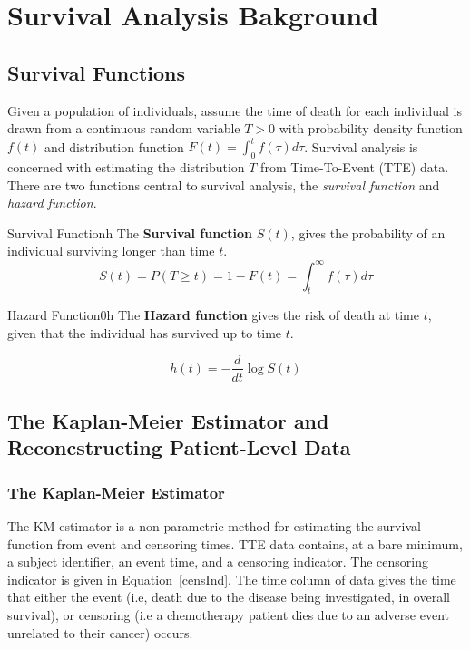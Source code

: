 \chapter{Survival Analysis Bakground}\label{survchap}

\section{Survival Functions}
Given a  population of individuals, assume the time of death for each individual is drawn from a continuous random variable $T > 0$ with probability density function $f(t)$ and distribution function $F(t) = \int_{0}^{t}f(\tau)d\tau$. Survival analysis is concerned with estimating the distribution $T$ from Time-To-Event (TTE) data. There are two functions central to survival analysis, the \textit{survival function} and \textit{hazard function}.

\begin{definition}{Survival Function}{h}
    The \textbf{Survival function} $S(t)$, gives the probability of an individual surviving longer than time $t$. 
    \begin{equation}
        S(t) = P(T \geq  t) = 1 - F(t) = \int_{t}^{\infty}f(\tau)d\tau  
    \end{equation}
\end{definition}

\begin{definition}{Hazard Function0}{h}
    The \textbf{Hazard function} gives the risk of death at time $t$, given that the individual has survived up to time $t$. 
    
    \begin{equation}
        h(t) = -\frac{d}{dt}\log S(t)  
    \end{equation}
\end{definition}

\section{The Kaplan-Meier Estimator and Reconcstructing Patient-Level Data}
\subsection{The Kaplan-Meier Estimator}
The KM estimator is a non-parametric method for estimating the survival function from event and censoring times. TTE data contains, at a bare minimum, a subject identifier, an event time, and a censoring indicator. The censoring indicator is given in Equation~\ref{censInd}. The time column of data gives the time that either the event (i.e, death due to the disease being investigated, in overall survival), or censoring (i.e a chemotherapy patient dies due to an adverse event unrelated to their cancer) occurs.


